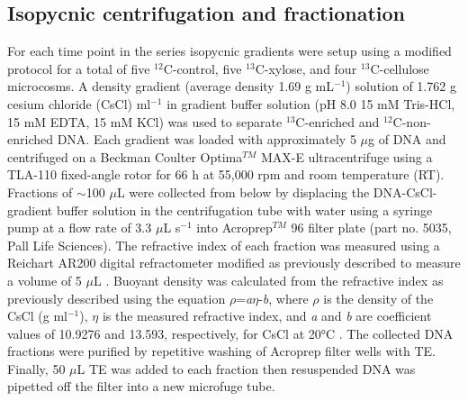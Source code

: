 \documentclass{article}
\begin{document}
\subsection{Isopycnic centrifugation and fractionation}
For each time point in the series isopycnic gradients were setup using
a modified protocol \citep{Neufeld_2007} for a total of five
$^{12}$C-control, five $^{13}$C-xylose, and four
$^{13}$C-cellulose microcosms. A density gradient (average density
1.69 g mL$^{-1}$) solution of 1.762 g cesium chloride (CsCl)
ml$^{-1}$ in gradient buffer solution (pH 8.0 15 mM Tris-HCl, 15
mM EDTA, 15 mM KCl) was used to separate $^{13}$C-enriched and
$^{12}$C-non-enriched DNA. Each gradient was loaded with approximately
5 $\mu$g of DNA and centrifuged on a Beckman Coulter Optima$^{TM}$ MAX-E
ultracentrifuge using a TLA-110 fixed-angle rotor for 66 h at 55,000 rpm
and room temperature (RT). Fractions of $\sim$100 $\mu$L were collected
from below by displacing the DNA-CsCl-gradient buffer solution in the
centrifugation tube with water using a syringe pump at a flow rate of 3.3
$\mu$L s$^{-1}$ \citep{Manefield_2002} into Acroprep$^{TM}$ 96 filter
plate (part no. 5035, Pall Life Sciences). The refractive index of each
fraction was measured using a Reichart AR200 digital refractometer
modified as previously described to measure a volume
of 5 $\mu$L \citep{Buckley_2007}. Buoyant density was calculated from the refractive index
as previously described \citep{Buckley_2007} using the equation
$\rho$=\textit{a}$\eta$-\textit{b}, where $\rho$ is the density of the
CsCl (g ml$^{-1}$), $\eta$ is the measured refractive index, and
\textit{a} and \textit{b} are coefficient values of 10.9276 and 13.593,
respectively, for CsCl at 20°C \citep{9780408708036}. The collected DNA
fractions were purified by repetitive washing of Acroprep filter wells
with TE. Finally, 50 $\mu$L TE was added to each fraction then resuspended
DNA was pipetted off the filter into a new microfuge tube.   
\end{document}
